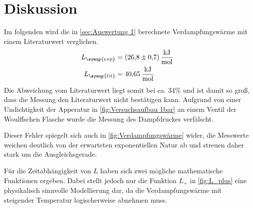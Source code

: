 \section{Diskussion}
\label{sec:Diskussion}

Im folgenden wird die in \autoref{sec:Auswertung 1} berechnete Verdampfungswärme mit einem Literaturwert \cite{czichos} verglichen.
\begin{align}
    L_{\symup{exp}}&=\qty{26,8+-0,7}{\kilo\joule\per\mol} \notag \\ 
    L_{\symup{lit}}&=\qty{40,65}{\kilo\joule\per\mol} \notag
\end{align}
Die Abweichung vom Literaturwert liegt somit bei ca. $34\%$ und ist damit so groß, dass die Messung den
Literaturwert nicht bestätigen kann.
Aufgrund von einer Undichtigkeit der Apperatur in \autoref{fig:Versuchsaufbau 1bar} an einem Ventil
der Woulffschen Flasche wurde die Messung des Dampfdruckes verfälscht.

Dieser Fehler spiegelt sich auch in \autoref{fig:Verdampfungswärme} wider, die Messwerte weichen deutlich
von der erwarteten exponentiellen Natur ab und streuen daher stark um die Ausgleichsgerade.

Für die Zeitabhängigkeit von $L$ haben sich zwei mögliche mathematische Funktionen ergeben.
Dabei stellt jedoch nur die Funktion $L_{+}$ in \autoref{fig:L_plus} eine physikalisch sinnvolle
Modellierung dar, da die Verdampfungswärme mit steigender Temperatur logischerweise abnehmen muss.